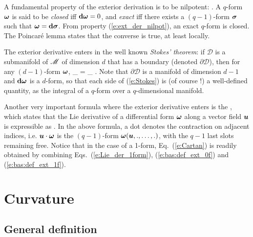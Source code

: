 A fundamental property of the exterior derivation is to be nilpotent:
\be \label{e:ext_der_nilpot}
    .
\ee
A $q$-form $\bm{\omega}$ is said to be \emph{closed} iff $\mathbf{d}\bm{\omega}=0$,
and \emph{exact} iff there exists a $(q-1)$-form $\bm{\sigma}$ such that
$\bm{\omega} = \mathbf{d}\bm{\sigma}$. From property (\ref{e:ext_der_nilpot}),
an exact $q$-form is closed. The Poincar\'e lemma states that the converse is true,
at least locally.

The exterior derivative enters in the well known \emph{Stokes' theorem}: if $\mathcal{D}$
is a submanifold of $\mathscr{M}$ of dimension $d$ that has a boundary (denoted $\partial\mathcal{D}$), then for any $(d-1)$-form $\bm{\omega}$,
\be \label{e:Stokes}
    \oint_{\partial{}} \w{\omega} =
    \int_{} \dd\w{\omega} .
\ee
Note that $\partial\mathcal{D}$ is a manifold of dimension $d-1$ and
$\mathbf{d}\bm{\omega}$ is a $d$-form, so that each side of
(\ref{e:Stokes}) is (of course !) a well-defined quantity,
as the integral of a $q$-form over a $q$-dimensional manifold.

Another very important formula where the exterior derivative enters is
the , which states that the
Lie derivative of a differential form
$\bm{\omega}$ along a vector field $\bm{u}$ is expressible as
\be \label{e:Cartan}
    .
\ee
In the above formula, a dot denotes the contraction on adjacent indices, i.e.
$\bm{u}\cdot\bm{\omega}$ is the $(q-1)$-form $\bm{\omega}(\bm{u},.,\ldots,.)$,
with the $q-1$ last slots remaining free. Notice that in
the case of a 1-form, Eq.~(\ref{e:Cartan}) is readily obtained
by combining Eqs.~(\ref{e:Lie_der_1form}),
(\ref{e:bas:def_ext_0f}) and (\ref{e:bas:def_ext_1f}).


\section{Curvature} \label{s:bas:curvat}

\subsection{General definition}

